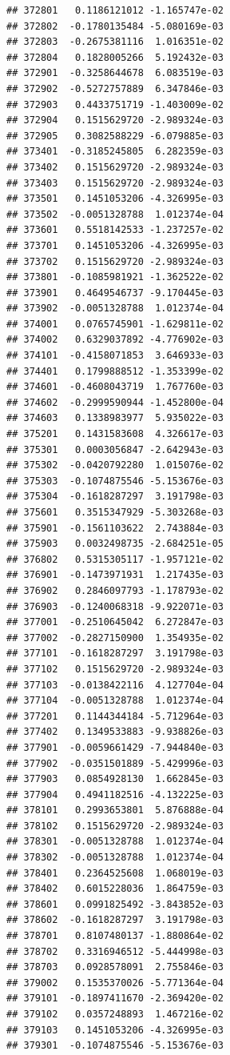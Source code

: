 \begin{frame}[fragile]
\begin{verbatim}
## 372801   0.1186121012 -1.165747e-02
## 372802  -0.1780135484 -5.080169e-03
## 372803  -0.2675381116  1.016351e-02
## 372804   0.1828005266  5.192432e-03
## 372901  -0.3258644678  6.083519e-03
## 372902  -0.5272757889  6.347846e-03
## 372903   0.4433751719 -1.403009e-02
## 372904   0.1515629720 -2.989324e-03
## 372905   0.3082588229 -6.079885e-03
## 373401  -0.3185245805  6.282359e-03
## 373402   0.1515629720 -2.989324e-03
## 373403   0.1515629720 -2.989324e-03
## 373501   0.1451053206 -4.326995e-03
## 373502  -0.0051328788  1.012374e-04
## 373601   0.5518142533 -1.237257e-02
## 373701   0.1451053206 -4.326995e-03
## 373702   0.1515629720 -2.989324e-03
## 373801  -0.1085981921 -1.362522e-02
## 373901   0.4649546737 -9.170445e-03
## 373902  -0.0051328788  1.012374e-04
## 374001   0.0765745901 -1.629811e-02
## 374002   0.6329037892 -4.776902e-03
## 374101  -0.4158071853  3.646933e-03
## 374401   0.1799888512 -1.353399e-02
## 374601  -0.4608043719  1.767760e-03
## 374602  -0.2999590944 -1.452800e-04
## 374603   0.1338983977  5.935022e-03
## 375201   0.1431583608  4.326617e-03
## 375301   0.0003056847 -2.642943e-03
## 375302  -0.0420792280  1.015076e-02
## 375303  -0.1074875546 -5.153676e-03
## 375304  -0.1618287297  3.191798e-03
## 375601   0.3515347929 -5.303268e-03
## 375901  -0.1561103622  2.743884e-03
## 375903   0.0032498735 -2.684251e-05
## 376802   0.5315305117 -1.957121e-02
## 376901  -0.1473971931  1.217435e-03
## 376902   0.2846097793 -1.178793e-02
## 376903  -0.1240068318 -9.922071e-03
## 377001  -0.2510645042  6.272847e-03
## 377002  -0.2827150900  1.354935e-02
## 377101  -0.1618287297  3.191798e-03
## 377102   0.1515629720 -2.989324e-03
## 377103  -0.0138422116  4.127704e-04
## 377104  -0.0051328788  1.012374e-04
## 377201   0.1144344184 -5.712964e-03
## 377402   0.1349533883 -9.938826e-03
## 377901  -0.0059661429 -7.944840e-03
## 377902  -0.0351501889 -5.429996e-03
## 377903   0.0854928130  1.662845e-03
## 377904   0.4941182516 -4.132225e-03
## 378101   0.2993653801  5.876888e-04
## 378102   0.1515629720 -2.989324e-03
## 378301  -0.0051328788  1.012374e-04
## 378302  -0.0051328788  1.012374e-04
## 378401   0.2364525608  1.068019e-03
## 378402   0.6015228036  1.864759e-03
## 378601   0.0991825492 -3.843852e-03
## 378602  -0.1618287297  3.191798e-03
## 378701   0.8107480137 -1.880864e-02
## 378702   0.3316946512 -5.444998e-03
## 378703   0.0928578091  2.755846e-03
## 379002   0.1535370026 -5.771364e-04
## 379101  -0.1897411670 -2.369420e-02
## 379102   0.0357248893  1.467216e-02
## 379103   0.1451053206 -4.326995e-03
## 379301  -0.1074875546 -5.153676e-03

\end{verbatim}
\end{frame}
